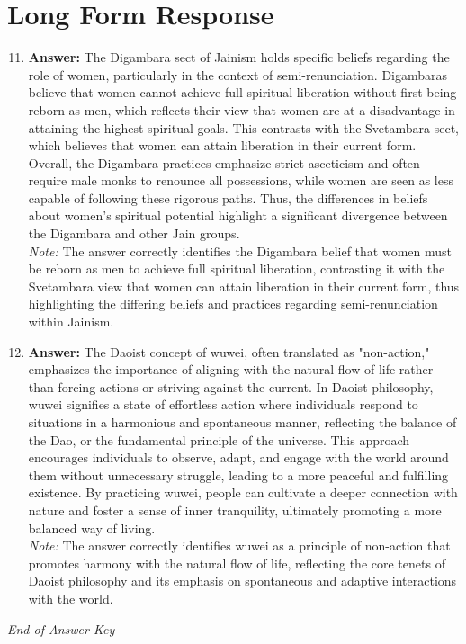 \documentclass[12pt]{article}
\begin{document}
\section*{Long Form Response}
\begin{enumerate}[label=\arabic*.]
\setcounter{enumi}{10}
\item \textbf{Answer:} The Digambara sect of Jainism holds specific beliefs regarding the role of women, particularly in the context of semi-renunciation. Digambaras believe that women cannot achieve full spiritual liberation without first being reborn as men, which reflects their view that women are at a disadvantage in attaining the highest spiritual goals. This contrasts with the Svetambara sect, which believes that women can attain liberation in their current form. Overall, the Digambara practices emphasize strict asceticism and often require male monks to renounce all possessions, while women are seen as less capable of following these rigorous paths. Thus, the differences in beliefs about women's spiritual potential highlight a significant divergence between the Digambara and other Jain groups.
\\ \textit{Note:} The answer correctly identifies the Digambara belief that women must be reborn as men to achieve full spiritual liberation, contrasting it with the Svetambara view that women can attain liberation in their current form, thus highlighting the differing beliefs and practices regarding semi-renunciation within Jainism.
\item \textbf{Answer:} The Daoist concept of wuwei, often translated as "non-action," emphasizes the importance of aligning with the natural flow of life rather than forcing actions or striving against the current. In Daoist philosophy, wuwei signifies a state of effortless action where individuals respond to situations in a harmonious and spontaneous manner, reflecting the balance of the Dao, or the fundamental principle of the universe. This approach encourages individuals to observe, adapt, and engage with the world around them without unnecessary struggle, leading to a more peaceful and fulfilling existence. By practicing wuwei, people can cultivate a deeper connection with nature and foster a sense of inner tranquility, ultimately promoting a more balanced way of living.
\\ \textit{Note:} The answer correctly identifies wuwei as a principle of non-action that promotes harmony with the natural flow of life, reflecting the core tenets of Daoist philosophy and its emphasis on spontaneous and adaptive interactions with the world.
\end{enumerate}

\vfill
\noindent\textit{End of Answer Key}
\end{document}
